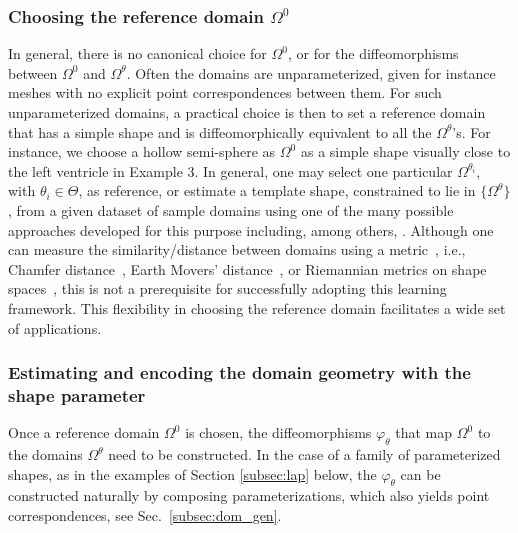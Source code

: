\documentclass[review]{elsarticle}
\def\Omegatheta{{\Omega^\theta}}
\def\refd{0}
\def\Omegaref{{\Omega^\refd}}
\begin{document}
\subsubsection{Choosing the reference domain $\Omegaref$}

In general, there is no canonical choice for $\Omegaref$, or for the diffeomorphisms between $\Omegaref$ and $\Omega^\theta$. Often the domains are unparameterized, given for instance meshes with no explicit point correspondences between them. For such unparameterized domains, a practical choice is then to set a reference domain that has a simple shape and is diffeomorphically equivalent to all the $\Omegatheta$'s. For instance, we choose a hollow semi-sphere as $\Omegaref$ as a simple shape visually close to the left ventricle in Example 3. In general, one may select one particular $\Omega^{\theta_i}$, with $\theta_i \in \Theta$, as reference, or estimate a template shape, constrained to lie in $\{\Omega^\theta\}$, from a given dataset of sample domains using one of the many possible approaches developed for this purpose including, among others, \cite{avants2004geodesic,joshi2004unbiased,ma2010bayesian,cury2017analysis,hartman2023elastic}. Although one can measure the similarity/distance between domains using a metric~\cite{miller2002metrics}, i.e., Chamfer distance~\cite{fan2017point,park2019deepsdf}, Earth Movers' distance~\cite{rock2015completing,rubner2000earth}, or Riemannian metrics on shape spaces~\cite{beg2005computing,grenander1998computational,bauer2012sobolev}, this is not a prerequisite for successfully adopting this learning framework. This flexibility in choosing the reference domain facilitates a wide set of applications.


\subsubsection{Estimating and encoding the domain geometry with the shape parameter}\label{sssec:pc}
Once a reference domain $\Omegaref$ is chosen, the diffeomorphisms $\varphi_{\theta}$ that map $\Omegaref$ to the domains $\Omegatheta$ need to be constructed. In the case of a family of parameterized shapes, as in the examples of Section \ref{subsec:lap} below, the $\varphi_{\theta}$ can be constructed naturally by composing parameterizations, which also yields point correspondences, see Sec.~\ref{subsec:dom_gen}. 
\end{document}
